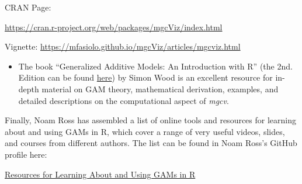 \documentclass[
]{article}
\providecommand{\tightlist}{%
  \setlength{\itemsep}{0pt}\setlength{\parskip}{0pt}}
\begin{document}
CRAN Page:

\url{https://cran.r-project.org/web/packages/mgcViz/index.html}

Vignette:
\url{https://mfasiolo.github.io/mgcViz/articles/mgcviz.html}

\begin{itemize}
\tightlist
\item
  The book ``Generalized Additive Models: An Introduction with R'' (the 2nd. Edition can be found \href{https://www.routledge.com/Generalized-Additive-Models-An-Introduction-with-R-Second-Edition/Wood/p/book/9781498728331}{here}) by Simon Wood is an excellent resource for in-depth material on GAM theory, mathematical derivation, examples, and detailed descriptions on the computational aspect of \emph{mgcv}.
\end{itemize}

Finally, Noam Ross has assembled a list of online tools and resources for learning about and using GAMs in R, which cover a range of very useful videos, slides, and courses from different authors. The list can be found in Noam Ross's GitHub profile here:

\href{https://github.com/noamross/gam-resources}{Resources for Learning About and Using GAMs in R}
\end{document}
